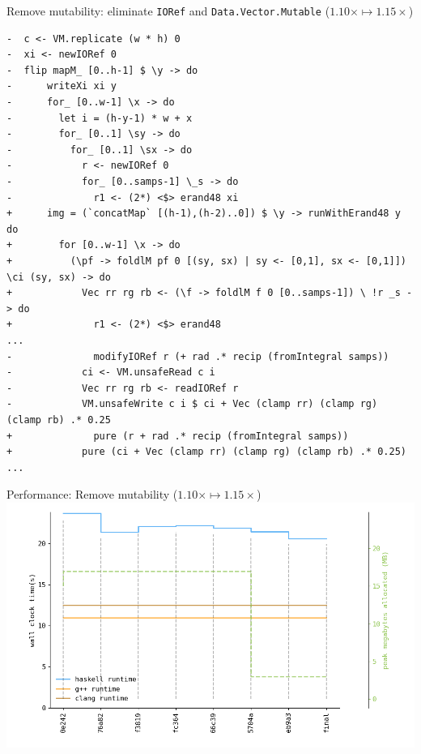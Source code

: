 \documentclass[8pt]{beamer}
\begin{document}
\begin{frame}[fragile]{Remove mutability: eliminate \texttt{IORef} and \texttt{Data.Vector.Mutable} ($1.10\times \mapsto  1.15\times$)}
\begin{verbatim}
-  c <- VM.replicate (w * h) 0
-  xi <- newIORef 0
-  flip mapM_ [0..h-1] $ \y -> do
-      writeXi xi y
-      for_ [0..w-1] \x -> do
-        let i = (h-y-1) * w + x
-        for_ [0..1] \sy -> do
-          for_ [0..1] \sx -> do
-            r <- newIORef 0
-            for_ [0..samps-1] \_s -> do
-              r1 <- (2*) <$> erand48 xi
+      img = (`concatMap` [(h-1),(h-2)..0]) $ \y -> runWithErand48 y do
+        for [0..w-1] \x -> do
+          (\pf -> foldlM pf 0 [(sy, sx) | sy <- [0,1], sx <- [0,1]]) \ci (sy, sx) -> do
+            Vec rr rg rb <- (\f -> foldlM f 0 [0..samps-1]) \ !r _s -> do
+              r1 <- (2*) <$> erand48
...
-              modifyIORef r (+ rad .* recip (fromIntegral samps))
-            ci <- VM.unsafeRead c i
-            Vec rr rg rb <- readIORef r
-            VM.unsafeWrite c i $ ci + Vec (clamp rr) (clamp rg) (clamp rb) .* 0.25
+              pure (r + rad .* recip (fromIntegral samps))
+            pure (ci + Vec (clamp rr) (clamp rg) (clamp rb) .* 0.25)
...
\end{verbatim}



\end{frame}



\begin{frame}[fragile]{Performance: Remove mutability  ($1.10\times \mapsto  1.15\times$)}
\includegraphics[height=0.6\textwidth]{perfdata-upto-eb9a3-gen.png}
\end{frame}
\end{document}
